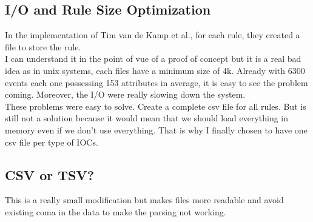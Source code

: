 \documentclass{eplmastersthesis}
\begin{document}
\subsection{I/O and Rule Size Optimization}
In the implementation of Tim van de Kamp et al., for each rule, they created a file to store the rule. \\
I can understand it in the point of vue of a proof of concept but it is a real bad idea as in unix systems, each files have a minimum size of 4k. Already with 6300 events each one possessing 153 attributes in average, it is easy to see the problem coming. Moreover, the I/O were really slowing down the system. \\
These problems were easy to solve. Create a complete csv file for all rules. But is still not a solution because it would mean that we should load everything in memory even if we don't use everything. That is why I finally chosen to have one csv file per type of IOCs.
\subsection{CSV or TSV?}
This is a really small modification but makes files more readable and avoid existing coma in the data to make the parsing not working.
\end{document}

